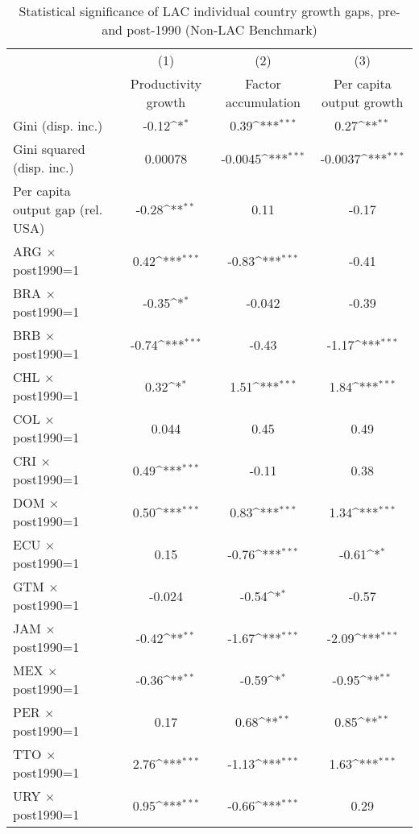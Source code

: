 \begin{table}[htbp]\centering
\def\sym#1{\ifmmode^{#1}\else\(^{#1}\)\fi}
\caption{Statistical significance of LAC individual country growth gaps, pre- and post-1990 (Non-LAC Benchmark)}
\begin{tabular}{l*{3}{c}}
\toprule
                &\multicolumn{1}{c}{(1)}&\multicolumn{1}{c}{(2)}&\multicolumn{1}{c}{(3)}\\
                &\multicolumn{1}{c}{Productivity growth}&\multicolumn{1}{c}{Factor accumulation}&\multicolumn{1}{c}{Per capita output growth}\\
\midrule
Gini (disp. inc.)&    -0.12\sym{*}  &     0.39\sym{***}&     0.27\sym{**} \\
Gini squared (disp. inc.)&  0.00078         &  -0.0045\sym{***}&  -0.0037\sym{***}\\
Per capita output gap (rel. USA)&    -0.28\sym{**} &     0.11         &    -0.17         \\
ARG $\times$ post1990=1&     0.42\sym{***}&    -0.83\sym{***}&    -0.41         \\
BRA $\times$ post1990=1&    -0.35\sym{*}  &   -0.042         &    -0.39         \\
BRB $\times$ post1990=1&    -0.74\sym{***}&    -0.43         &    -1.17\sym{***}\\
CHL $\times$ post1990=1&     0.32\sym{*}  &     1.51\sym{***}&     1.84\sym{***}\\
COL $\times$ post1990=1&    0.044         &     0.45         &     0.49         \\
CRI $\times$ post1990=1&     0.49\sym{***}&    -0.11         &     0.38         \\
DOM $\times$ post1990=1&     0.50\sym{***}&     0.83\sym{***}&     1.34\sym{***}\\
ECU $\times$ post1990=1&     0.15         &    -0.76\sym{***}&    -0.61\sym{*}  \\
GTM $\times$ post1990=1&   -0.024         &    -0.54\sym{*}  &    -0.57         \\
JAM $\times$ post1990=1&    -0.42\sym{**} &    -1.67\sym{***}&    -2.09\sym{***}\\
MEX $\times$ post1990=1&    -0.36\sym{**} &    -0.59\sym{*}  &    -0.95\sym{**} \\
PER $\times$ post1990=1&     0.17         &     0.68\sym{**} &     0.85\sym{**} \\
TTO $\times$ post1990=1&     2.76\sym{***}&    -1.13\sym{***}&     1.63\sym{***}\\
URY $\times$ post1990=1&     0.95\sym{***}&    -0.66\sym{***}&     0.29         \\

\end{tabular}
\end{table}
